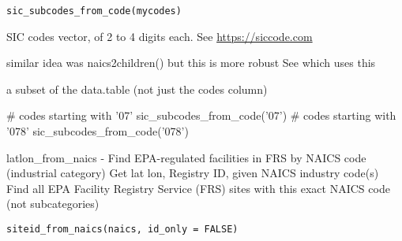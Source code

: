 \documentclass[a4paper]{book}
\begin{document}
%
\begin{Usage}
\begin{verbatim}
sic_subcodes_from_code(mycodes)
\end{verbatim}
\end{Usage}
%
\begin{Arguments}
\begin{ldescription}
\item[\code{mycodes}] SIC codes vector, of 2 to 4 digits each. See \url{https://siccode.com}
\end{ldescription}
\end{Arguments}
%
\begin{Details}\relax
similar idea was naics2children() but this is more robust
See  which uses this
\end{Details}
%
\begin{Value}
a subset of the  data.table (not just the codes column)
\end{Value}
%
\begin{SeeAlso}\relax
{}     
\end{SeeAlso}
%
\begin{Examples}
\begin{ExampleCode}
  # codes starting with '07'
  sic_subcodes_from_code('07')
  # codes starting with '078'
  sic_subcodes_from_code('078')
\end{ExampleCode}
\end{Examples}
%
\begin{Description}\relax
latlon\_from\_naics - Find EPA-regulated facilities in FRS by NAICS code (industrial category)
Get lat lon, Registry ID, given NAICS industry code(s)
Find all EPA Facility Registry Service (FRS) sites with this exact NAICS code (not subcategories)
\end{Description}
%
\begin{Usage}
\begin{verbatim}
siteid_from_naics(naics, id_only = FALSE)
\end{verbatim}
\end{Usage}
\end{document}
